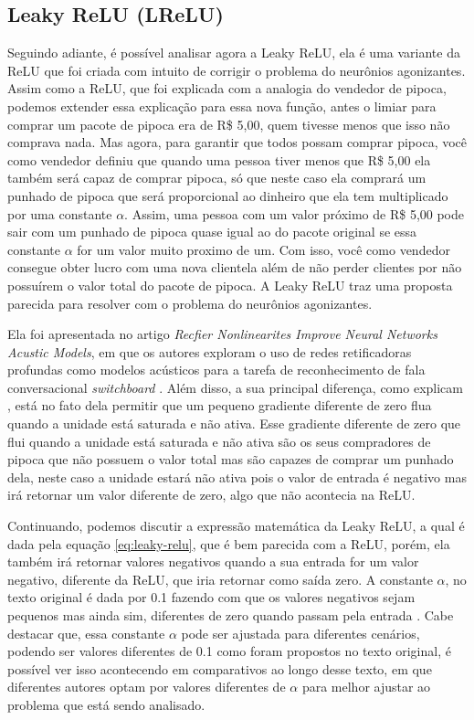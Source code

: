 \subsection{Leaky ReLU (LReLU)}

Seguindo adiante, é possível analisar agora a Leaky ReLU, ela é uma variante da ReLU que foi criada com intuito de corrigir o problema do neurônios agonizantes. Assim como a ReLU, que foi explicada com a analogia do vendedor de pipoca, podemos extender essa explicação para essa nova função, antes o limiar para comprar um pacote de pipoca era de R\$ 5,00, quem tivesse menos que isso não comprava nada. Mas agora, para garantir que todos possam comprar pipoca, você como vendedor definiu que quando uma pessoa tiver menos que R\$ 5,00 ela também será capaz de comprar pipoca, só que neste caso ela comprará um punhado de pipoca que será proporcional ao dinheiro que ela tem multiplicado por uma constante $\alpha$. Assim, uma pessoa com um valor próximo de R\$ 5,00 pode sair com um punhado de pipoca quase igual ao do pacote original se essa constante $\alpha$ for um valor muito proximo de um. Com isso, você como vendedor consegue obter lucro com uma nova clientela além de não perder clientes por não possuírem o valor total do pacote de pipoca. A Leaky ReLU traz uma proposta parecida para resolver com o problema do neurônios agonizantes.

Ela foi apresentada no artigo \textit{Recfier Nonlinearites Improve Neural Networks Acustic Models}, em que os autores exploram o uso de redes retificadoras profundas como modelos acústicos para a tarefa de reconhecimento de fala conversacional \textit{switchboard} \parencite{LeakyReLUArticle}. Além disso, a sua principal diferença, como explicam \textcite{LeakyReLUArticle}, está no fato dela permitir que um pequeno gradiente diferente de zero flua quando a unidade está saturada e não ativa. Esse gradiente diferente de zero que flui quando a unidade está saturada e não ativa são os seus compradores de pipoca que não possuem o valor total mas são capazes de comprar um punhado dela, neste caso a unidade estará não ativa pois o valor de entrada é negativo mas irá retornar um valor diferente de zero, algo que não acontecia na ReLU.

Continuando, podemos discutir a expressão matemática da Leaky ReLU, a qual é dada pela equação \ref{eq:leaky-relu}, que é bem parecida com a ReLU, porém, ela também irá retornar valores negativos quando a sua entrada for um valor negativo, diferente da ReLU, que iria retornar como saída zero. A constante $\alpha$, no texto original é dada por 0.1 fazendo com que os valores negativos sejam pequenos mas ainda sim, diferentes de zero quando passam pela entrada \parencite{LeakyReLUArticle}. Cabe destacar que, essa constante $\alpha$ pode ser ajustada para diferentes cenários, podendo ser valores diferentes de 0.1 como foram propostos no texto original, é possível ver isso acontecendo em comparativos ao longo desse texto, em que diferentes autores optam por valores diferentes de $\alpha$ para melhor ajustar ao problema que está sendo analisado.

